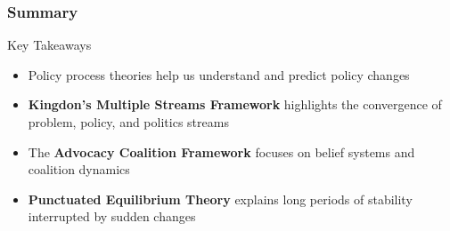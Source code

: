 \documentclass[10pt]{beamer}
\begin{document}
\begin{frame}
\frametitle{Summary}

\begin{block}{Key Takeaways}
  \begin{itemize}
    \item Policy process theories help us understand and predict policy changes
    \item \textbf{Kingdon's Multiple Streams Framework} highlights the convergence of problem, policy, and politics streams
    \item The \textbf{Advocacy Coalition Framework} focuses on belief systems and coalition dynamics
    \item \textbf{Punctuated Equilibrium Theory} explains long periods of stability interrupted by sudden changes
  \end{itemize}
\end{block}

\vspace{1cm}

\begin{center}
\end{center}

\end{frame}
\end{document}
